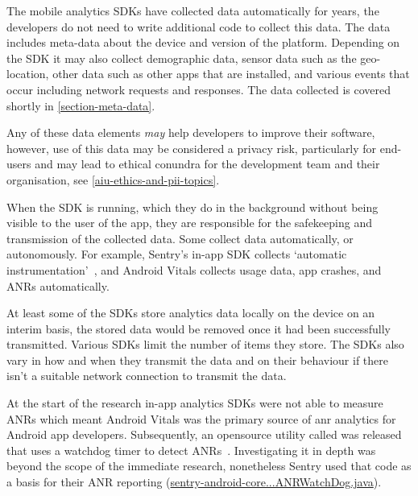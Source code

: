 The mobile analytics SDKs have collected data automatically for years, the developers do not need to write additional code to collect this data. The data includes meta-data about the device and version of the platform. Depending on the SDK it may also collect demographic data, sensor data such as the geo-location, other data such as other apps that are installed, and various events that occur including network requests and responses. The data collected is covered shortly in \ref{section-meta-data}.

Any of these data elements \emph{may} help developers to improve their software, however, use of this data may be considered a privacy risk, particularly for end-users and may lead to ethical conundra for the development team and their organisation, see \ref{aiu-ethics-and-pii-topics}.

When the SDK is running, which they do in the background without being visible to the user of the app, they are responsible for the safekeeping and transmission of the collected data. Some collect data automatically, or autonomously. For example, Sentry's in-app SDK collects `automatic instrumentation'~, and Android Vitals collects usage data, app crashes, and ANRs automatically.

At least some of the SDKs store analytics data locally on the device on an interim basis, the stored data would be removed once it had been successfully transmitted. Various SDKs limit the number of items they store. The SDKs also vary in how and when they transmit the data and on their behaviour if there isn't a suitable network connection to transmit the data.


At the start of the research in-app analytics SDKs were not able to measure ANRs which meant Android Vitals was the primary source of \Gls{anr} analytics for Android app developers. Subsequently, an opensource utility called  was released that uses a watchdog timer to detect ANRs~. 
Investigating it in depth was beyond the scope of the immediate research, nonetheless Sentry used that code as a basis for their ANR reporting (\href{https://github.com/getsentry/sentry-java/blob/3f8d7b1cc869bb056c9db99b459e43f6c375784a/sentry-android-core/src/main/java/io/sentry/android/core/ANRWatchDog.java}{sentry-android-core...ANRWatchDog.java}). 

